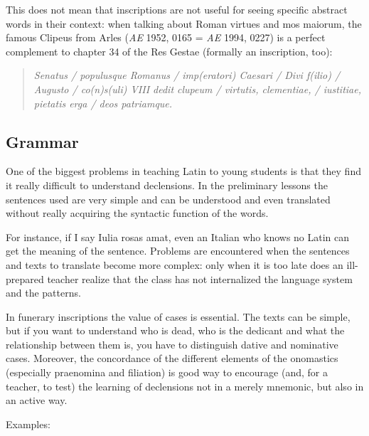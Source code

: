 \documentclass[amsthm,ebook]{saparticle}
\begin{document}
This does not mean that inscriptions are not useful for seeing specific abstract words in their context: when talking
about Roman virtues and mos maiorum, the famous Clipeus from Arles (\emph{AE} 1952, 0165 = \emph{AE} 1994, 0227) is a
perfect complement to chapter 34 of the Res Gestae (formally an inscription, too): \begin{quotation}
\emph{Senatus / populusque Romanus /
imp(eratori) Caesari / Divi f(ilio) / Augusto / co(n)s(uli) VIII dedit clupeum / virtutis, clementiae, / iustitiae,
pietatis erga / deos patriamque.}

\end{quotation}



\subsection{Grammar}
\noindent One of the biggest problems in teaching Latin to young students is that they find it really difficult to understand
declensions. In the preliminary lessons the sentences used are very simple and can be understood and even translated
without really acquiring the syntactic function of the words.

For instance, if I say Iulia rosas amat, even an Italian who knows no Latin can get the meaning of the sentence.
Problems are encountered when the sentences and texts to translate become more complex: only when it is too late does
an ill-prepared teacher realize that the class has not internalized the language system and the patterns.

In funerary inscriptions the value of cases is essential. The texts can be simple, but if you want to understand who is
dead, who is the dedicant and what the relationship between them is, you have to distinguish dative and nominative
cases. Moreover, the concordance of the different elements of the onomastics (especially praenomina and filiation) is
good way to encourage (and, for a teacher, to test) the learning of declensions not in a merely mnemonic, but also in
an active way.

Examples:
\end{document}
